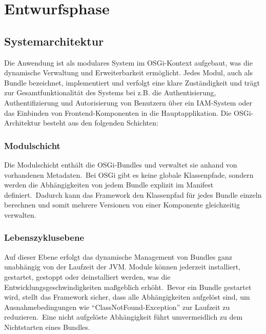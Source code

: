 \section{Entwurfsphase} 
\label{sec:Entwurfsphase}

\subsection{Systemarchitektur}
\label{subsec:Systemarchitektur}

Die Anwendung ist als modulares System im OSGi-Kontext aufgebaut, was die dynamische Verwaltung und Erweiterbarkeit ermöglicht.
Jedes Modul, auch als Bundle bezeichnet, implementiert und verfolgt eine klare Zuständigkeit und trägt zur Gesamtfunktionalität des Systems bei z.B.
die Authentisierung, Authentifizierung und Autorisierung von Benutzern über ein IAM-System oder das Einbinden von Frontend-Komponenten in die Hauptapplikation.
Die OSGi-Architektur besteht aus den folgenden Schichten:

\subsubsection{Modulschicht}
\label{subsubsec:Modulschicht}

Die Modulschicht enthält die OSGi-Bundles und verwaltet sie anhand von vorhandenen Metadaten.\ Bei OSGi gibt es keine globale Klassenpfade, sondern werden die
Abhängigkeiten von jedem Bundle explizit im Manifest definiert.\ Dadurch kann das Framework den Klassenpfad für jedes Bundle einzeln berechnen und somit mehrere
Versionen von einer Komponente gleichzeitig verwalten.

\subsubsection{Lebenszyklusebene}
\label{subsubsec:Lebenszyklusebene}

Auf dieser Ebene erfolgt das dynamische Management von Bundles ganz unabhängig von der Laufzeit der JVM. Module können jederzeit installiert, gestartet, gestoppt oder
deinstalliert werden, was die Entwicklungsgeschwindigkeiten maßgeblich erhöht.\ Bevor ein Bundle gestartet wird, stellt das Framework sicher,
dass alle Abhängigkeiten aufgelöst sind, um Ausnahmebedingungen wie "`ClassNotFound-Exception"' zur Laufzeit zu reduzieren.\ Eine nicht aufgelöste Abhängigkeit führt umvermeidlich
zu dem Nichtstarten eines Bundles.


